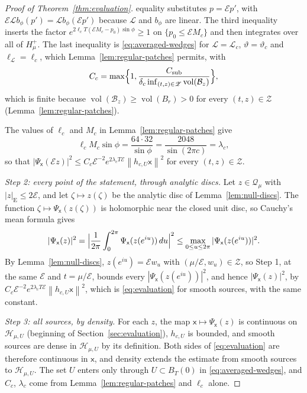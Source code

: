 \documentclass[11pt]{amsart}
\numberwithin{equation}{section}
\theoremstyle{definition}
\newcommand{\Hh}{\mathcal H}
\newcommand{\sx}{\mathsf x}
\newcommand{\Energy}{\mathcal E}
\newcommand{\vol}{\operatorname{vol}}
\newcommand{\norm}[1]{\left\|#1\right\|}
\begin{document}
\begin{proof}[Proof of Theorem~\ref{thm:evaluation}]
equality substitutes \(p=\Energy p'\), with
\(\Energy\mathcal Lb_\phi(p')=\mathcal Lb_\phi(\Energy p')\) because
\(\mathcal L\) and \(b_\phi\) are linear. The third inequality inserts the
factor \(e^{2\ell_cT(\Energy M_c-p_0)\sin\phi}\ge1\) on
\(\{p_0\le\Energy M_c\}\) and then integrates over all of \(H_\mu^+\). The
last inequality is \eqref{eq:averaged-wedges} for
\(\mathscr L=\mathscr L_c\), \(\vartheta=\vartheta_c\) and
\(\ell_{\mathscr L}=\ell_c\), which Lemma~\ref{lem:regular-patches} permits,
with
\[
 C_c=\max\Bigl\{1,\frac{C_{\mathrm{sub}}}
 {\delta_c\inf_{(t,z)\in\mathscr Z}\vol(\mathcal B_z)}\Bigr\},
\]
which is finite because \(\vol(\mathcal B_z)\ge\vol(B_r)>0\) for every
\((t,z)\in\mathscr Z\) (Lemma~\ref{lem:regular-patches}).

The values of \(\ell_c\) and \(M_c\) in Lemma~\ref{lem:regular-patches} give
\[
 \ell_cM_c\sin\phi
 =\frac{64\cdot32}{\sin\phi}
 =\frac{2048}{\sin(2\pi c)}=\lambda_c,
\]
so that
\(|\Psi_\sx(\Energy z)|^2\le C_c\Energy^{-2}e^{2\lambda_cT\Energy}
\norm{h_{c,U}\sx}^2\) for every \((t,z)\in\mathscr Z\).

\smallskip
\emph{Step 2: every point of the statement, through analytic discs.} Let
\(z\in\mathcal Q_\mu\) with \(|z|_{\mathrm E}\le2\Energy\), and let
\(\zeta\mapsto z(\zeta)\) be the analytic disc of
Lemma~\ref{lem:null-discs}. The function \(\zeta\mapsto\Psi_\sx(z(\zeta))\)
is holomorphic near the closed unit disc, so Cauchy's mean formula gives
\[
 |\Psi_\sx(z)|^2
 =\Bigl|\frac1{2\pi}\int_0^{2\pi}\Psi_\sx(z(e^{iu}))\,du\Bigr|^2
 \le\max_{0\le u\le2\pi}|\Psi_\sx(z(e^{iu}))|^2.
\]
By Lemma~\ref{lem:null-discs}, \(z(e^{iu})=\Energy w_u\) with
\((\mu/\Energy,w_u)\in\mathscr Z\), so Step 1, at the same \(\Energy\) and
\(t=\mu/\Energy\), bounds every \(|\Psi_\sx(z(e^{iu}))|^2\), and hence \(|\Psi_\sx(z)|^2\), by
\(C_c\Energy^{-2}e^{2\lambda_cT\Energy}\norm{h_{c,U}\sx}^2\), which is
\eqref{eq:evaluation} for smooth sources, with the same constant.

\smallskip
\emph{Step 3: all sources, by density.} For each \(z\), the map
\(\sx\mapsto\Psi_\sx(z)\) is continuous on \(\Hh_{\mu,U}\) (beginning of
Section~\ref{sec:evaluation}), \(h_{c,U}\) is bounded, and smooth sources
are dense in \(\Hh_{\mu,U}\) by its definition. Both sides of
\eqref{eq:evaluation} are therefore continuous in \(\sx\), and density
extends the estimate from smooth sources to \(\Hh_{\mu,U}\).
The set \(U\) enters only through \(U\subset B_T(0)\) in
\eqref{eq:averaged-wedges}, and \(C_c\), \(\lambda_c\) come from
Lemma~\ref{lem:regular-patches} and \(\ell_c\) alone.
\end{proof}
\end{document}
